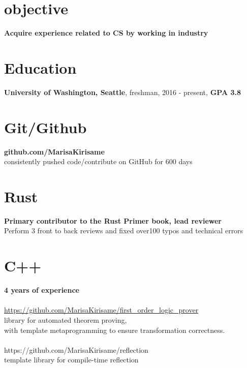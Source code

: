 \documentclass[margin,line]{res}
\begin{document}

\begin{resume}




\section{\sc objective}
\textbf{Acquire experience related to CS by working in industry}

\section{\sc Education}
\textbf{University of Washington, Seattle}, freshman, 2016 - present, 
\textbf{GPA 3.8}

\section{\sc Git/Github}
\textbf{github.com/MarisaKirisame} \\
consistently pushed code/contribute on GitHub for 600 days

\section{\sc Rust}
\textbf{Primary contributor to the Rust Primer book, lead reviewer} \\
Perform 3 front to back reviews and fixed over100 typos and technical errors

\section{\sc C++} 
\textbf{4 years of experience} \\
\\
\url{https://github.com/MarisaKirisame/first_order_logic_prover} \\
library for automated theorem proving, \\
with template metaprogramming to ensure transformation correctness. \\
\\
https://github.com/MarisaKirisame/reflection \\
template library for compile-time reflection


\end{resume}
\end{document}
